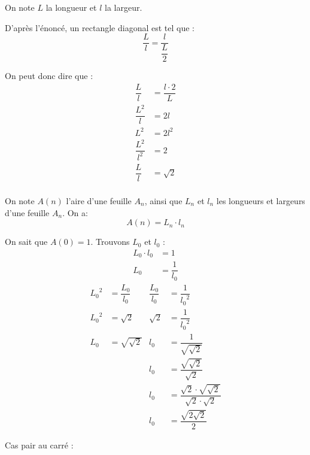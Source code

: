 

On note $L$ la longueur et $l$ la largeur.

D'après l'énoncé, un rectangle diagonal est tel que :
\begin{equation*}
	\dfrac{L}{l} = \dfrac{l}{\dfrac{L}{2}}
\end{equation*}

On peut donc dire que :
\begin{equation*}
	\begin{split}
		\dfrac{L}{l} & = \dfrac{l \cdot 2}{L} \\
		 \dfrac{L^2}{l} & = 2l \\
		 L^2 & = 2l^2 \\
		 \dfrac{L^2}{l^2} & = 2 \\
		 \dfrac{L}{l} & = \sqrt 2 \\
	\end{split}
\end{equation*}

On note $A(n)$ l'aire d'une feuille $A_n$, ainsi que $L_n$ et $l_n$ les longueurs et largeurs d'une feuille $A_n$. On a:
\begin{equation*}
	A(n) = L_n \cdot l_n
\end{equation*}

On sait que $A(0) = 1$. Trouvons $L_0$ et $l_0$ :
\begin{equation}
	\begin{split}
		L_0 \cdot l_0 & = 1 \\
		L_0 & = \dfrac 1 {l_0}
	\end{split}
\end{equation}
\begin{align*}
	{L_0}^2 &= \dfrac{L_0}{l_0} & \dfrac{L_0}{l_0}&=\dfrac 1 {{l_0}^2} \\
	{L_0}^2 &= \sqrt 2 & \sqrt{2}&=\dfrac 1 {{l_0}^2} \\
	L_0 &= \sqrt{\sqrt{2}} & l_0&=\dfrac{1}{\sqrt{\sqrt{2}}} \\
	& & l_0 &= \dfrac {\sqrt{\sqrt{2}}} {\sqrt{2}} \\
	& & l_0 &= \dfrac{\sqrt{2}\cdot\sqrt{ \sqrt{2}}}{\sqrt{2}\cdot\sqrt{2}}\\
	& & l_0 &= \dfrac{\sqrt{2\sqrt{2}}}{2}
\end{align*}


Cas pair au carré :

